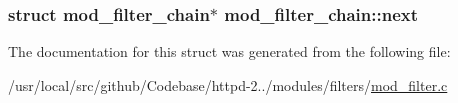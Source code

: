 \subsubsection[{\texorpdfstring{next}{next}}]{\setlength{\rightskip}{0pt plus 5cm}struct {\bf mod\+\_\+filter\+\_\+chain}$\ast$ mod\+\_\+filter\+\_\+chain\+::next}\hypertarget{structmod__filter__chain_a95b66dd76d8ec3e9b5984632d01769d4}{}\label{structmod__filter__chain_a95b66dd76d8ec3e9b5984632d01769d4}


The documentation for this struct was generated from the following file\+:\begin{DoxyCompactItemize}
\item 
/usr/local/src/github/\+Codebase/httpd-\/2../modules/filters/\hyperlink{mod__filter_8c}{mod\+\_\+filter.\+c}\end{DoxyCompactItemize}
